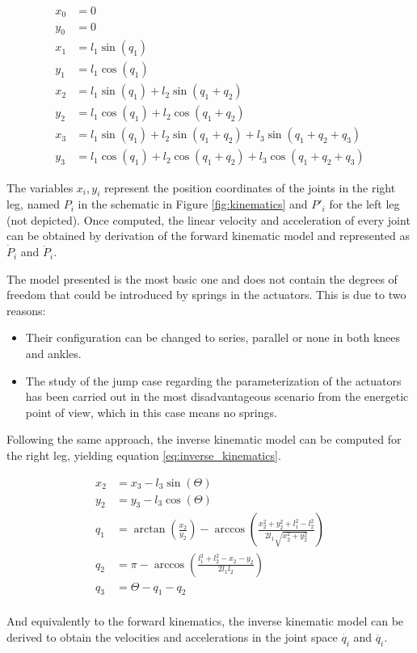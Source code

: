 \begin{equation}
\label{eq:forward_kinematics}
	\begin{aligned}
		x_{0} &= 0 \\
		y_{0} &= 0 \\
		x_{1} &= l_{1} \sin(q_{1}) \\
		y_{1} &= l_{1} \cos(q_{1}) \\
		x_{2} &= l_{1} \sin(q_{1}) + l_{2} \sin(q_{1}+q_{2}) \\
		y_{2} &= l_{1} \cos(q_{1}) + l_{2} \cos(q_{1}+q_{2}) \\
		x_{3} &= l_{1} \sin(q_{1}) + l_{2} \sin(q_{1}+q_{2}) + l_{3} \sin(q_{1}+q_{2}+q_{3}) \\
		y_{3} &= l_{1} \cos(q_{1}) + l_{2} \cos(q_{1}+q_{2}) + l_{3} \cos(q_{1}+q_{2}+q_{3}) 
	\end{aligned}
\end{equation}

The variables $x_{i}, y_{i}$ represent the position coordinates of the joints in the right leg, named $P_{i}$ in the schematic in Figure \ref{fig:kinematics} and $P'_{i}$ for the left leg (not depicted).
Once computed, the linear velocity and acceleration of every joint can be obtained by derivation of the forward kinematic model and represented as $\dot{P}_{i}$ and $\ddot{P}_{i}$.


The model presented is the most basic one and does not contain the degrees of freedom that could be introduced by springs in the actuators.
This is due to two reasons:

\begin{itemize}
	\item Their configuration can be changed to series, parallel or none in both knees and ankles.
	\item The study of the jump case regarding the parameterization of the actuators has been carried out in the most disadvantageous scenario from the energetic point of view, which in this case means no springs.
\end{itemize}

Following the same approach, the inverse kinematic model can be computed for the right leg, yielding equation \ref{eq:inverse_kinematics}.


\begin{equation}
\label{eq:inverse_kinematics}
	\begin{aligned}
		x_{2} &= x_{3} - l_{3} \sin(\Theta) \\
		y_{2} &= y_{3} - l_{3} \cos(\Theta) \\
		q_{1} &= \arctan \left(\frac{x_{2}}{y_{2}}\right) - \arccos \left(\frac{x_{2}^2 + y_{2}^2 + l_{1}^2 - l_{2}^2}{2 l_{1} \sqrt{x_{2}^2 + y_{2}^2}}\right) \\
		q_{2} &= \pi - \arccos \left(\frac{l_{1}^2 + l_{2}^2 - x_{2} - y_{2}}{2 l_{1} l_{2}}\right) \\
		q_{3} &= \Theta - q_{1} - q_{2} \\
	\end{aligned}
\end{equation}

And equivalently to the forward kinematics, the inverse kinematic model can be derived to obtain the velocities and accelerations in the joint space $\dot{q_{i}}$ and $\ddot{q_{i}}$.
